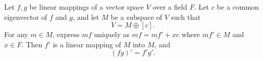 Let $f, g$ be linear mappings of a vector space $V$ over a field $F$. Let $c$ be a common eigenvector of $f$ and $g$, and let $M$ be a subspace of $V$ such that
$$V = M \oplus [c].$$
For any $m \in M$, express $mf$ uniquely as $mf = mf' + xc$ where $mf' \in M$ and $x \in F$. Then $f'$ is a linear mapping of $M$ into $M$, and
$$(fg)' = f'g'.$$
